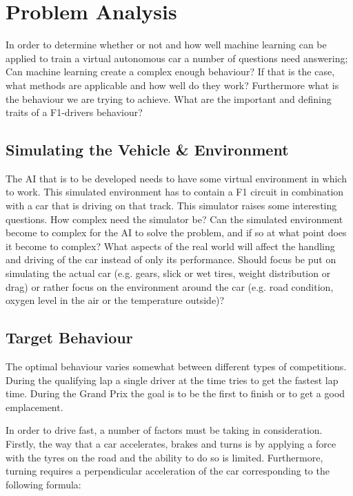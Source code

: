 \chapter{Problem Analysis}

In order to determine whether or not and how well machine learning can be applied to train a virtual autonomous car a number of questions need answering; Can machine learning create a complex enough behaviour? If that is the case, what methods are applicable and how well do they work? Furthermore what is the behaviour we are trying to achieve. What are the important and defining traits of a F1-drivers behaviour? 

\section{Simulating the Vehicle \& Environment}
The AI that is to be developed needs to have some virtual environment in which to work. This simulated environment has to contain a F1 circuit in combination with a car that is driving on that track. This simulator raises some interesting questions. How complex need the simulator be? Can the simulated environment become to complex for the AI to solve the problem, and if so at what point does it become to complex? What aspects of the real world will affect the handling and driving of the car instead of only its performance. Should focus be put on simulating the actual car (e.g. gears, slick or wet tires, weight distribution or drag) or rather focus on the environment around the car (e.g. road condition, oxygen level in the air or the temperature outside)?

\section{Target Behaviour}
The optimal behaviour varies somewhat between different types of competitions. During the qualifying lap a single driver at the time tries to get the fastest lap time. During the Grand Prix the goal is to be the first to finish or to get a good emplacement. 

In order to drive fast, a number of factors must be taking in consideration. Firstly, the way that a car accelerates, brakes and turns is by applying a force with the tyres on the road and the ability to do so is limited\cite{beckman_traction_budget}. Furthermore, turning requires a perpendicular acceleration of the car corresponding to the following formula:

